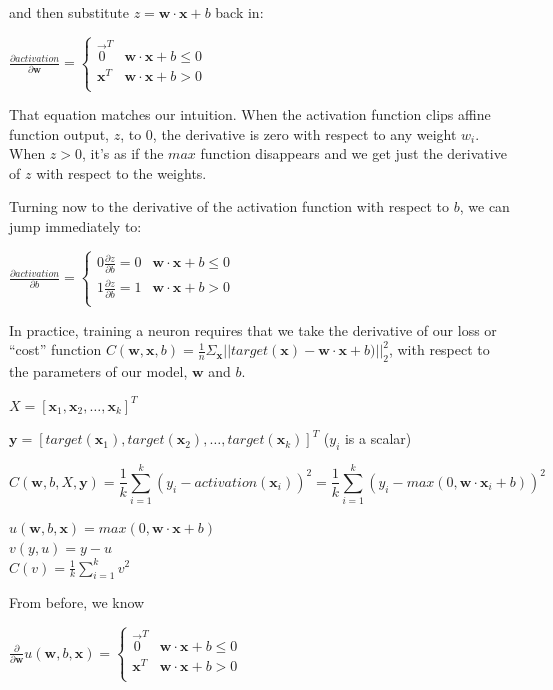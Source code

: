 \documentclass[11pt]{article}
\begin{document}
and then substitute $z = \mathbf{w} \cdot \mathbf{x} + b$ back in:
 
$\frac{\partial activation}{\partial \mathbf{w}} = \begin{cases}
	\vec{0}^T & \mathbf{w} \cdot \mathbf{x} + b \leq 0\\
	\mathbf{x}^T & \mathbf{w} \cdot \mathbf{x} + b > 0\\
\end{cases}$

That equation matches our intuition.  When the activation function clips affine function output, $z$, to 0, the derivative is zero with respect to any weight $w_i$. When $z > 0$, it's as if the $max$ function disappears and we get just the derivative of $z$ with respect to the weights. 

Turning now to the derivative of the activation function with respect to $b$, we can jump immediately to:
 
$\frac{\partial activation}{\partial b} = \begin{cases}
	0\frac{\partial z}{\partial b} = 0 & \mathbf{w} \cdot \mathbf{x} + b \leq 0\\
	1\frac{\partial z}{\partial b} = 1 & \mathbf{w} \cdot \mathbf{x} + b > 0\\
\end{cases}
$

In practice, training a neuron requires that we take the derivative of our loss  or ``cost'' function $C(\mathbf{w},\mathbf{x},b) = \frac{1}{n} \Sigma_{\mathbf{x}} ||target(\mathbf{x}) - \mathbf{w}\cdot\mathbf{x}+b)||_2^2$, with respect to the parameters of our model, $\mathbf{w}$ and $b$.

$X = [\mathbf{x}_1, \mathbf{x}_2, \ldots, \mathbf{x}_k]^T$

$\mathbf{y} = [target(\mathbf{x}_1), target(\mathbf{x}_2), \ldots, target(\mathbf{x}_k)]^T$ ($y_i$ is a scalar)

\[
C(\mathbf{w},b,X,\mathbf{y}) = \frac{1}{k} \sum_{i=1}^{k} (y_i - activation(\mathbf{x}_i))^2 = \frac{1}{k} \sum_{i=1}^{k} (y_i - max(0, \mathbf{w}\cdot\mathbf{x}_i+b))^2
\]

$u(\mathbf{w},b,\mathbf{x}) = max(0, \mathbf{w}\cdot\mathbf{x}+b)$\\
$v(y,u) = y - u$\\
$C(v) = \frac{1}{k} \sum_{i=1}^k v^2$

From before, we know

$\frac{\partial }{\partial \mathbf{w}} u(\mathbf{w},b,\mathbf{x}) = \begin{cases}
	\vec{0}^T & \mathbf{w} \cdot \mathbf{x} + b \leq 0\\
	\mathbf{x}^T & \mathbf{w} \cdot \mathbf{x} + b > 0\\
\end{cases}$
\end{document}
